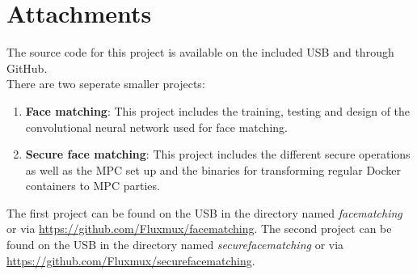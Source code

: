 \chapter{Attachments}
The source code for this project is available on the included USB and through GitHub.\\

There are two seperate smaller projects:
\begin{enumerate}
  \item \textbf{Face matching}: This project includes the training, testing and design of the convolutional neural network used for face matching.
  \item \textbf{Secure face matching}: This project includes the different secure operations as well as the MPC set up and the binaries for transforming regular Docker containers to MPC parties.
\end{enumerate}

The first project can be found on the USB in the directory named \textit{facematching} or via \url{https://github.com/Fluxmux/facematching}. The second project can be found on the USB in the directory named \textit{securefacematching} or via \url{https://github.com/Fluxmux/securefacematching}.
